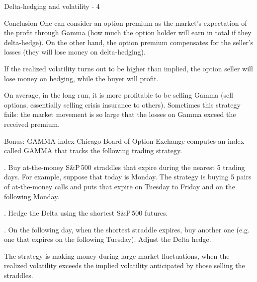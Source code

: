 \documentclass{beamer}
\begin{document}
\begin{frame}{Delta-hedging and volatility - 4}
\centering
{}
\end{frame}



\begin{frame}{Conclusion}
\justify
One can consider an option premium as the market's expectation of the profit through Gamma (how much the option holder will earn in total if they delta-hedge). On the other hand, the option premium compensates for the seller's losses (they will lose money on delta-hedging).

\justify
If the realized volatility turns out to be higher than implied, the option seller will lose money on hedging, while the buyer will profit.

\justify
On average, in the long run, it is more profitable to be selling Gamma (sell options, essentially selling crisis insurance to others). Sometimes this strategy fails: the market movement is so large that the losses on Gamma exceed the received premium.
\end{frame}


\begin{frame}{Bonus: GAMMA index}
\justify
Chicago Board of Option Exchange computes an index called \alert{GAMMA} that tracks the following trading strategy.

. Buy at-the-money S\&P\,500 straddles that expire during the nearest 5 trading days. For example, suppose that today is Monday. The strategy is buying 5 pairs of at-the-money calls and puts that expire on Tuesday to Friday and on the following Monday.

. Hedge the Delta using the shortest S\&P\,500 futures.

. On the following day, when the shortest straddle expires, buy another one (e.g. one that expires on the following Tuesday). Adjust the Delta hedge.

\justify
The strategy is making money during large market fluctuations, when the realized volatility exceeds the implied volatility anticipated by those selling the straddles.
\end{frame}
\end{document}

